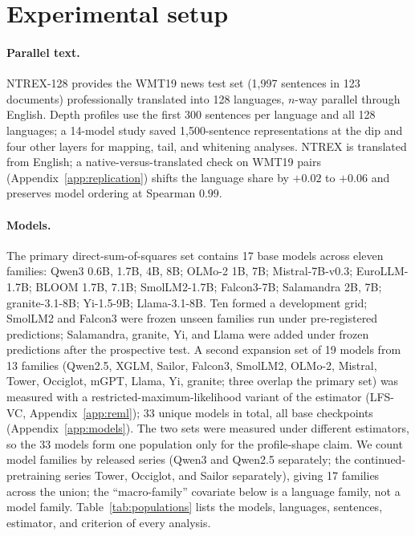 \documentclass{article} %
\begin{document}
\section{Experimental setup}
\label{sec:setup}

\paragraph{Parallel text.} NTREX-128 \citep{federmann2022ntrex} provides the
WMT19 news test set (1,997 sentences in 123 documents) professionally
translated into 128 languages, $n$-way parallel through English. Depth
profiles use the first 300 sentences per language and all 128 languages; a
14-model study saved 1,500-sentence representations at the dip and four
other layers for mapping, tail, and whitening analyses. NTREX is translated
from English; a native-versus-translated check on WMT19 pairs
(Appendix~\ref{app:replication}) shifts the language share by $+0.02$ to
$+0.06$ and preserves model ordering at Spearman $0.99$.

\paragraph{Models.} The primary direct-sum-of-squares set contains 17 base
models across eleven families: Qwen3 0.6B, 1.7B, 4B, 8B; OLMo-2 1B, 7B;
Mistral-7B-v0.3; EuroLLM-1.7B; BLOOM 1.7B, 7.1B; SmolLM2-1.7B; Falcon3-7B;
Salamandra 2B, 7B; granite-3.1-8B; Yi-1.5-9B; Llama-3.1-8B. Ten formed a
development grid; SmolLM2 and Falcon3 were frozen unseen families run under
pre-registered predictions; Salamandra, granite, Yi, and Llama were added
under frozen predictions after the prospective test. A second expansion set of 19 models from 13 families (Qwen2.5, XGLM, Sailor, Falcon3, SmolLM2, OLMo-2, Mistral, Tower, Occiglot, mGPT, Llama, Yi, granite; three overlap the primary set) was measured with a restricted-maximum-likelihood variant of the estimator (LFS-VC, Appendix~\ref{app:reml}); 33 unique models in total, all base checkpoints (Appendix~\ref{app:models}). The two sets were measured under different estimators, so the 33 models form one population only for the profile-shape claim. We count model families by released series (Qwen3 and Qwen2.5 separately; the continued-pretraining series Tower, Occiglot, and Sailor separately), giving 17 families across the union; the ``macro-family'' covariate below is a language family, not a model family. Table~\ref{tab:populations} lists the models, languages, sentences, estimator, and criterion of every analysis.
\end{document}
